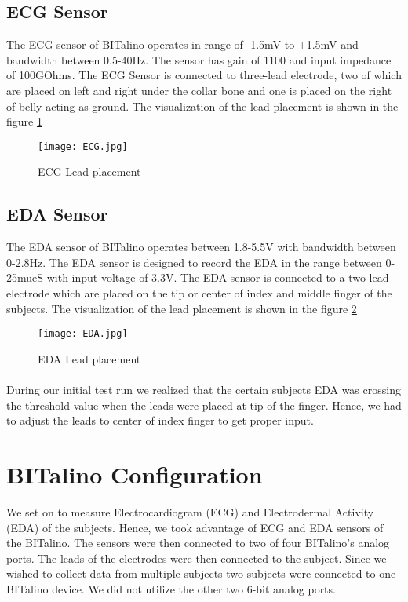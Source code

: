 \subsection{ECG Sensor}
The ECG sensor of BITalino operates in range of -1.5mV to +1.5mV and bandwidth between 0.5-40Hz. The sensor has gain of 1100 and input impedance of 100GOhms. The ECG Sensor is connected to three-lead electrode, two of which are placed on left and right under the collar bone and one is placed on the right of belly acting as ground. The visualization of the lead placement is shown in the figure \ref{fig:ecg_lead_placement}
\begin{figure}
	\centering
	\texttt{[image: ECG.jpg]}
	\caption{ECG Lead placement}
	\label{fig:ecg_lead_placement}
\end{figure}
\subsection{EDA Sensor}
The EDA sensor of BITalino operates between 1.8-5.5V with bandwidth between 0-2.8Hz. The EDA sensor is designed to record the EDA in the range between 0-25mueS with input voltage of 3.3V. The EDA sensor is connected to a two-lead electrode which are placed on the tip or center of index and middle finger of the subjects. The visualization of the lead placement is shown in the figure \ref{fig:eda_lead_placement}
\begin{figure}
	\centering
	\texttt{[image: EDA.jpg]}
	\caption{EDA Lead placement}
	\label{fig:eda_lead_placement}
\end{figure}
\paragraph{}
During our initial test run we realized that the certain subjects EDA was crossing the threshold value when the leads were placed at tip of the finger. Hence, we had to adjust the leads to center of index finger to get proper input.

\section{BITalino Configuration}
We set on to measure Electrocardiogram (ECG) and Electrodermal Activity (EDA) of the subjects. Hence, we took advantage of ECG and EDA sensors of the BITalino. The sensors were then connected to two of four BITalino’s analog ports. The leads of the electrodes were then connected to the subject. Since we wished to collect data from multiple subjects two subjects were connected to one BITalino device. We did not utilize the other two 6-bit analog ports. 
